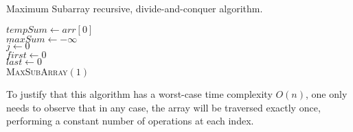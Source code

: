 \documentclass[12pt]{article}
\theoremstyle{definition}
\theoremstyle{remark}
\begin{document}
\begin{enumerate}
\begin{algorithm}
\caption{Maximum Subarray recursive, divide-and-conquer algorithm. }\label{algo_disjdecomp}
  $tempSum \leftarrow arr[0]$\\ 
$maxSum \leftarrow -\infty$ \\ 
$j \leftarrow 0$\\ 
$first \leftarrow 0$ \\ 
$last \leftarrow 0$\\ 

  \textsc{MaxSubArray}$(1)$ \\
  \BlankLine

\end{algorithm}\DecMargin{1em}


To justify that this algorithm has a worst-case time complexity $O(n)$, one only needs to observe that in any case, the array will be traversed exactly once, performing a constant number of operations at each index.

\end{enumerate}
\end{document}
